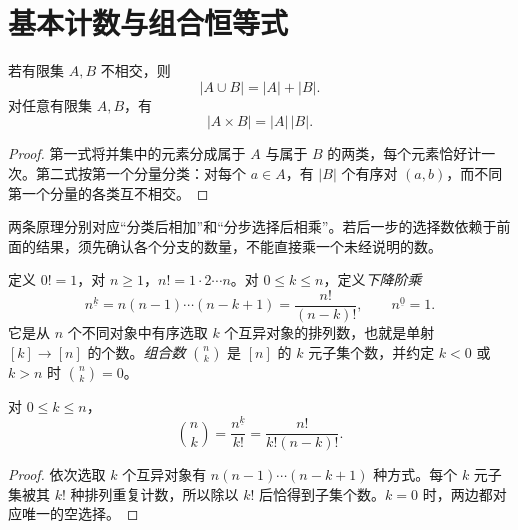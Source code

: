 \documentclass[lang=cn,a4paper,fontset=none,zihao=false,10pt,openany,twoside]{beautybook}
\numberwithin{algorithm}{chapter}
\begin{document}
\section{基本计数与组合恒等式}\label{sec:counting-identities}
\begin{proposition}[加法原理与乘法原理]
若有限集 $A,B$ 不相交，则
\[
 |A\cup B|=|A|+|B|.
\]
对任意有限集 $A,B$，有
\[
 |A\times B|=|A|\,|B|.
\]
\end{proposition}
\begin{proof}
第一式将并集中的元素分成属于 $A$ 与属于 $B$ 的两类，每个元素恰好计一次。第二式按第一个分量分类：对每个 $a\in A$，有 $|B|$ 个有序对 $(a,b)$，而不同第一个分量的各类互不相交。
\end{proof}
两条原理分别对应“分类后相加”和“分步选择后相乘”。若后一步的选择数依赖于前面的结果，须先确认各个分支的数量，不能直接乘一个未经说明的数。

\begin{definition}[排列数与组合数]
定义 $0!=1$，对 $n\ge1$，$n!=1\cdot2\cdots n$。对 $0\le k\le n$，定义\emph{下降阶乘}
\[
 n^{\underline{k}}=n(n-1)\cdots(n-k+1)=\frac{n!}{(n-k)!},
 \qquad n^{\underline0}=1.
\]
它是从 $n$ 个不同对象中有序选取 $k$ 个互异对象的排列数，也就是单射 $[k]\to[n]$ 的个数。\emph{组合数} $\binom nk$ 是 $[n]$ 的 $k$ 元子集个数，并约定 $k<0$ 或 $k>n$ 时 $\binom nk=0$。
\end{definition}
\begin{proposition}[组合数的阶乘公式]
对 $0\le k\le n$，
\[
 \binom nk=\frac{n^{\underline{k}}}{k!}
 =\frac{n!}{k!(n-k)!}.
\]
\end{proposition}
\begin{proof}
依次选取 $k$ 个互异对象有 $n(n-1)\cdots(n-k+1)$ 种方式。每个 $k$ 元子集被其 $k!$ 种排列重复计数，所以除以 $k!$ 后恰得到子集个数。$k=0$ 时，两边都对应唯一的空选择。
\end{proof}
\end{document}
